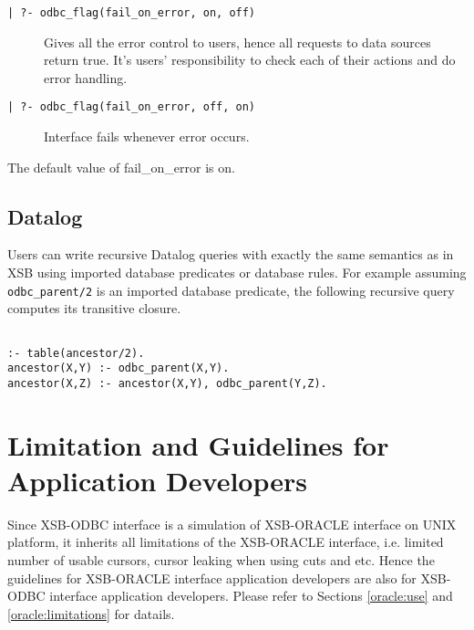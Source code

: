 \begin{description}

\item[\tt | ?- odbc\_flag(fail\_on\_error, on, off)] Gives all the error control 
to users, hence all requests to data sources return true.  It's users' 
responsibility to check each of their actions and do error handling.

\item[\tt | ?- odbc\_flag(fail\_on\_error, off, on)] Interface fails whenever 
error occurs.
\end{description}

The default value of fail\_on\_error is on.


\subsection{Datalog}
Users can write recursive Datalog queries with exactly the same
semantics as in XSB using imported database predicates or database
rules.  For example assuming {\tt odbc\_parent/2} is an imported database
predicate, the following recursive query computes its transitive closure.

\begin{verbatim}

:- table(ancestor/2).
ancestor(X,Y) :- odbc_parent(X,Y).
ancestor(X,Z) :- ancestor(X,Y), odbc_parent(Y,Z).
\end{verbatim}


\section{Limitation and Guidelines for Application Developers} \label{Guide}
Since XSB-ODBC interface is a simulation of XSB-ORACLE interface on UNIX 
platform, it inherits all limitations of the XSB-ORACLE interface, i.e. limited 
number of usable cursors, cursor leaking when using cuts and etc.  Hence 
the guidelines for XSB-ORACLE interface application 
developers are also for XSB-ODBC interface application developers.  
Please refer to Sections \ref{oracle:use} and \ref{oracle:limitations}
for datails. 

